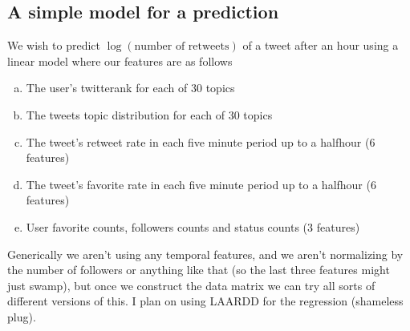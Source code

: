 \subsection*{A simple model for a prediction}

We wish to predict $\log(\mbox{number of retweets})$ of a tweet after an hour using a linear model where our features are as follows

\begin{enumerate}[a)]

\item

  The user's twitterank for each of 30 topics

\item 
  
  The tweets topic distribution for each of 30 topics

\item 

  The tweet's retweet rate in each five minute period up to a halfhour (6 features)

\item 

  The tweet's favorite rate in each five minute period up to a halfhour (6 features)

\item 

  User favorite counts, followers counts and status counts (3 features)

\end{enumerate}

Generically we aren't using any temporal features, and we aren't normalizing by the number of followers or anything like that (so the last three features might just swamp), but once we construct the data matrix we can try all sorts of different versions of this.  
I plan on using LAARDD for the regression (shameless plug).   
